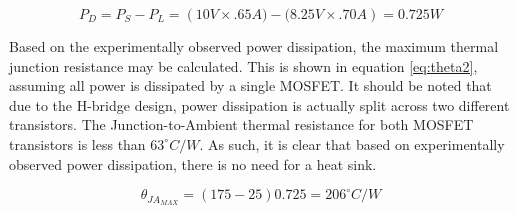 \begin{equation}
	\label{eq:PD}
	P_D =  P_S - P_L = \left({10 V}{\times}{.65 A}) - ({8.25 V}{\times}{.70 A}\right)
	    { = 0.725 W }
\end{equation}

Based on the experimentally observed power dissipation, the maximum thermal junction resistance may be calculated.
This is shown in equation \ref{eq:theta2}, assuming all power is dissipated by a single MOSFET.
It should be noted that due to the H-bridge design, power dissipation is actually split across two different transistors.
The Junction-to-Ambient thermal resistance for both MOSFET transistors is less than  $63^{\circ}C/W$.
As such, it is clear that based on experimentally observed power dissipation, there is no need for a heat sink.

\begin{equation}
	\label{eq:theta2}
	\theta_{JA_{MAX}} = \left({175 - 25}\right) {0.725 }
	{ = 206  ^{\circ}C/W}
\end{equation}
